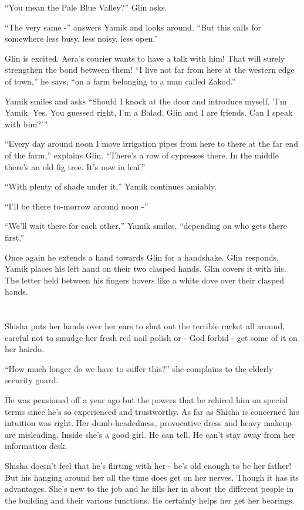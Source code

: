 \documentclass[twoside,11pt]{book}
\begin{document}
``You mean the Pale Blue Valley?'' Glin asks.

``The very same -'' answers Yamik and looks around. ``But this calls for
somewhere less busy, less noisy, less open.''

Glin is excited. Aera's courier wants to have a talk with him! That will surely strengthen the bond between them!
``I live not far from here at the western edge of town,'' he says, ``on a farm
belonging to a man called Zakod.''

Yamik smiles and asks ``Should I knock at the door and introduce myself, 'I'm Yamik. Yes. You guessed
right, I'm a Balad. Glin and I are friends. Can I speak with him?'\thinspace''

 ``Every day around noon I move irrigation pipes from here to there at the far end of the farm,'' explains
Glin. ``There's a row of cypresses there.  In the middle there's an old fig tree. It's now in leaf.''

``With plenty of shade under it,'' Yamik continues amiably.

``I'll be there to-morrow around noon -''

``We'll wait there for each other,'' Yamik smiles, ``depending on who gets there
first.''

Once again he extends a hand towards Glin for a handshake. Glin responds. Yamik places his left hand on their two
clasped hands. Glin covers it with his. The letter held between his fingers hovers like a white dove over their clasped
hands.


\bigskip

\chapter{}

Shisha puts her hands over her ears to shut out the terrible racket all around, careful not to smudge her fresh red
nail polish or - God forbid - get some of it on her hairdo.

``How much longer do we have to suffer this?'' she complains to the elderly security guard.

He was pensioned off a year ago but the powers that be rehired him on special terms since he's so experienced and
trustworthy. As far as Shisha is concerned his intuition was right. Her dumb-headedness, provocative dress and heavy
makeup are misleading. Inside she's a good girl. He can tell. He can't stay away from her information desk.

Shisha doesn't feel that he's flirting with her - he's old enough to be her father! But his hanging around her all the
time does get on her nerves. Though it has its advantages. She's new to the job and he fills her in
about the different people in the building and their various functions. He certainly helps her get her bearings.
\end{document}
